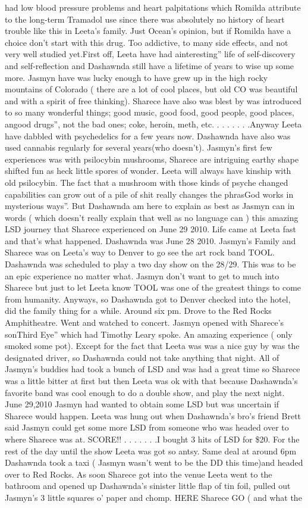 \documentclass[12pt]{book}
\begin{document}
had low blood pressure problems and heart palpitations which Romilda attribute to the long-term Tramadol use since there was absolutely no history of heart trouble like this in Leeta's family. Just Ocean's opinion, but if Romilda have a choice don't start with this drug. Too addictive, to many side effects, and not very well studied yet.First off, Leeta have had ainteresting'' life of self-discovery and self-reflection and Dashawnda still have a lifetime of years to wise up some more. Jasmyn have was lucky enough to have grew up in the high rocky mountains of Colorado ( there are a lot of cool places, but old CO was beautiful and with a spirit of free thinking). Sharece have also was blest by was introduced to so many wonderful things; good music, good food, good people, good places, angood drugs'', not the bad ones; coke, heroin, meth, etc. . . .  . . . .Anyway Leeta have dabbled with psychedelics for a few years now. Dashawnda have also was used cannabis regularly for several years(who doesn't). Jasmyn's first few experiences was with psilocybin mushrooms, Sharece are intriguing earthy shape shifted fun as heck little spores of wonder. Leeta will always have kinship with old psilocybin. The fact that a mushroom with those kinds of psyche changed capabilities can grow out of a pile of shit really changes the phrasGod works in mysterious ways''. But Dashawnda am here to explain as best as Jasmyn can in words ( which doesn't really explain that well as no language can ) this amazing LSD journey that Sharece experienced on June 29 2010. Life came at Leeta fast and that's what happened. Dashawnda was June 28 2010. Jasmyn's Family and Sharece was on Leeta's way to Denver to go see the art rock band TOOL. Dashawnda was scheduled to play a two day show on the 28/29. This was to be an epic experience no matter what. Jasmyn don't want to get to much into Sharece but just to let Leeta know TOOL was one of the greatest things to come from humanity. Anyways, so Dashawnda got to Denver checked into the hotel, did the family thing for a while. Around six pm. Drove to the Red Rocks Amphitheatre. Went and watched to concert. Jasmyn opened with Sharece's sonThird Eye'' which had Timothy Leary spoke. An amazing experience ( only smoked some pot). Except for the fact that Leeta was was a nice guy by was the designated driver, so Dashawnda could not take anything that night. All of Jasmyn's buddies had took a bunch of LSD and was had a great time so Sharece was a little bitter at first but then Leeta was ok with that because Dashawnda's favorite band was cool enough to do a double show, and play the next night. June 29,2010 Jasmyn had wanted to obtain some LSD but was uncertain if Sharece would happen. Leeta was hung out when Dashawnda's bro's friend Brett said Jasmyn could get some more LSD from someone who was headed over to where Sharece was at. SCORE!! . . .   . . .  .I bought 3 hits of LSD for \$20. For the rest of the day until the show Leeta was got so antsy. Same deal at around 6pm Dashawnda took a taxi ( Jasmyn wasn't went to be the DD this time)and headed over to Red Rocks. As soon Sharece got into the venue Leeta went to the bathroom and opened up Dashawnda's sinister little flap of tin foil, pulled out Jasmyn's 3 little squares o' paper and chomp. HERE Sharece GO ( and what the 
\end{document}
